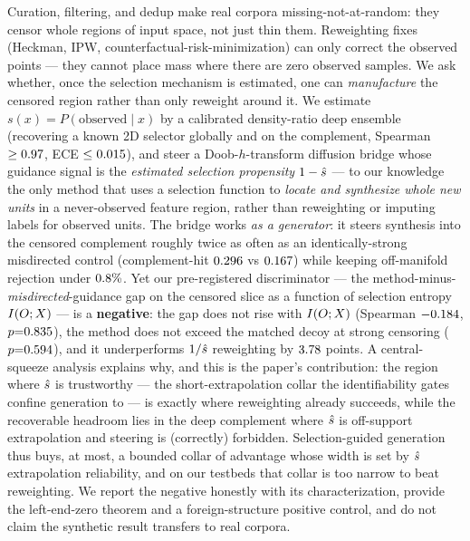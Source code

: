Curation, filtering, and dedup make real corpora missing-not-at-random: they
censor whole regions of input space, not just thin them. Reweighting fixes
(Heckman, IPW, counterfactual-risk-minimization) can only correct the observed
points --- they cannot place mass where there are zero observed samples. We ask
whether, once the selection mechanism is estimated, one can \emph{manufacture}
the censored region rather than only reweight around it. We estimate
$s(x)=P(\text{observed}\mid x)$ by a calibrated density-ratio deep ensemble
(recovering a known 2D selector globally and on the complement, Spearman
$\ge0.97$, ECE $\le0.015$), and steer a Doob-$h$-transform
diffusion bridge whose guidance signal is the \emph{estimated selection
propensity} $1-\hat s$ --- to our knowledge the only method that uses a selection
function to \emph{locate and synthesize whole new units} in a never-observed
feature region, rather than reweighting or imputing labels for observed units.
The bridge works \emph{as a generator}: it steers synthesis into the censored
complement roughly twice as often as an identically-strong misdirected control
(complement-hit $0.296$ vs $0.167$) while keeping
off-manifold rejection under $0.8\%$. Yet our pre-registered
discriminator --- the method-minus-\emph{misdirected}-guidance gap on the
censored slice as a function of selection entropy $I(O;X)$ --- is a
\textbf{negative}: the gap does not rise with $I(O;X)$ (Spearman $-0.184$,
$p{=}0.835$), the method does not exceed the matched decoy at strong
censoring ($p{=}0.594$), and it underperforms $1/\hat s$ reweighting
by $3.78$ points. A central-squeeze analysis explains why, and this
is the paper's contribution: the region where $\hat s$ is trustworthy --- the
short-extrapolation collar the identifiability gates confine generation to ---
is exactly where reweighting already succeeds, while the recoverable headroom
lies in the deep complement where $\hat s$ is off-support extrapolation and
steering is (correctly) forbidden. Selection-guided generation thus buys, at
most, a bounded collar of advantage whose width is set by $\hat s$ extrapolation
reliability, and on our testbeds that collar is too narrow to beat reweighting.
We report the negative honestly with its characterization, provide the
left-end-zero theorem and a foreign-structure positive control, and do not claim
the synthetic result transfers to real corpora.
